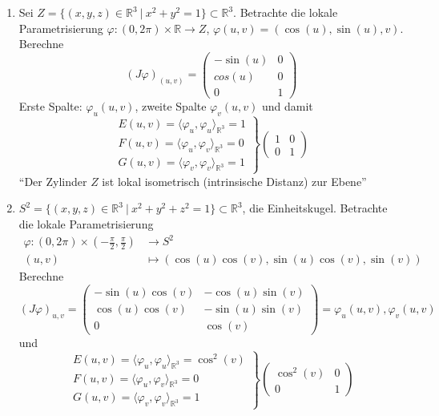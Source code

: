 \documentclass[../main.tex]{subfiles}
\begin{document}
\begin{examples}
    \leavevmode
    \begin{enumerate}
        \item Sei $Z=\{(x,y,z)\in \mathbb{R}^3 \ | \ x^2 + y^2 =1 \} \subset \mathbb{R}^3$.
        Betrachte die lokale Parametrisierung $\varphi : (0,2\pi) \times \mathbb{R} \to Z$, $\varphi (u,v) = (\cos(u), \sin(u), v)$.
        Berechne$$
        (J\varphi)_{(u,v)}=\begin{pmatrix}
            -\sin(u) & 0 \\
            cos(u) & 0 \\
            0 & 1
        \end{pmatrix}$$
        Erste Spalte: $\varphi_u(u,v)$, zweite Spalte $\varphi_v(u,v)$ und damit
        \[
        \left. 
        \begin{matrix} E(u,v)=\langle \varphi_u,\varphi_u\rangle _{\mathbb{R}^3} = 1 \\ 
            F(u,v)=\langle \varphi_u,\varphi_v\rangle _{\mathbb{R}^3} = 0 \\
            G(u,v)=\langle \varphi_v,\varphi_v\rangle _{\mathbb{R}^3} = 1 \end{matrix} 
        \right\} \begin{pmatrix}
            1 & 0 \\ 0 & 1
        \end{pmatrix}
        \]``Der Zylinder $Z$ ist lokal isometrisch (intrinsische Distanz) zur Ebene''

        \item $S^2 = \{(x,y,z) \in \mathbb{R}^3 \ | \ x^2+y^2+z^2 = 1 \} \subset \mathbb{R}^3$, die Einheitskugel.
        Betrachte die lokale Parametrisierung
        \begin{align*}
            \varphi : (0,2\pi) \times (-\frac{\pi}{2}, \frac{\pi}{2}) &\to S^2 \\
            (u,v) &\mapsto (\cos(u)\cos(v), \sin(u)\cos(v), \sin(v))
        \end{align*}
        Berechne
        $$(J\varphi)_{u,v}= \begin{pmatrix}
            -\sin(u)\cos(v) & -\cos(u)\sin(v) \\
            \cos(u)\cos(v) & -\sin(u)\sin(v) \\
            0 & \cos(v)
        \end{pmatrix} = \varphi _u (u,v), \varphi_v(u,v)$$
        und
        \[
        \left. 
        \begin{matrix} E(u,v)=\langle \varphi_u,\varphi_u\rangle _{\mathbb{R}^3} = \cos^2(v) \\ 
            F(u,v)=\langle \varphi_u,\varphi_v\rangle _{\mathbb{R}^3} = 0 \\
            G(u,v)=\langle \varphi_v,\varphi_v\rangle _{\mathbb{R}^3} = 1 \end{matrix} 
        \right\} \begin{pmatrix}
            \cos^2(v) & 0 \\ 0 & 1
        \end{pmatrix}
        \]


\end{enumerate}
\end{examples}
\end{document}
